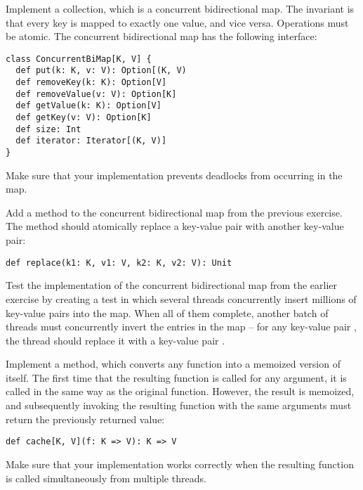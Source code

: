 \documentclass[11pt]{article}
\begin{document}
\begin{myExercise}Implement a  collection, which is a concurrent bidirectional map. The invariant is that every key is mapped to exactly one value, and vice versa. Operations must be atomic. The concurrent bidirectional map has the following interface:
\begin{lstlisting}
class ConcurrentBiMap[K, V] {
  def put(k: K, v: V): Option[(K, V)
  def removeKey(k: K): Option[V]
  def removeValue(v: V): Option[K]
  def getValue(k: K): Option[V]
  def getKey(v: V): Option[K]
  def size: Int
  def iterator: Iterator[(K, V)]
}
\end{lstlisting}
Make sure that your implementation prevents deadlocks from occurring in the map.
\end{myExercise}

\begin{myExercise}Add a  method to the concurrent bidirectional map from the previous exercise. The method should atomically replace a key-value pair with another key-value pair:
\begin{lstlisting}
def replace(k1: K, v1: V, k2: K, v2: V): Unit
\end{lstlisting}
\end{myExercise}

\begin{myExercise}Test the implementation of the concurrent bidirectional map from the earlier exercise by creating a test in which several threads concurrently insert millions of key-value pairs into the map. When all of them complete, another batch of threads must concurrently invert the entries in the map -- for any key-value pair , the thread should replace it with a key-value pair .
\end{myExercise}

\begin{myExercise}Implement a  method, which converts any function into a memoized version of itself. The first time that the resulting function is called for any argument, it is called in the same way as the original function. However, the result is memoized, and subsequently invoking the resulting function with the same arguments must return the previously returned value:
\begin{lstlisting}
def cache[K, V](f: K => V): K => V
\end{lstlisting}
Make sure that your implementation works correctly when the resulting function is called simultaneously from multiple threads.
\end{myExercise}
\end{document}
